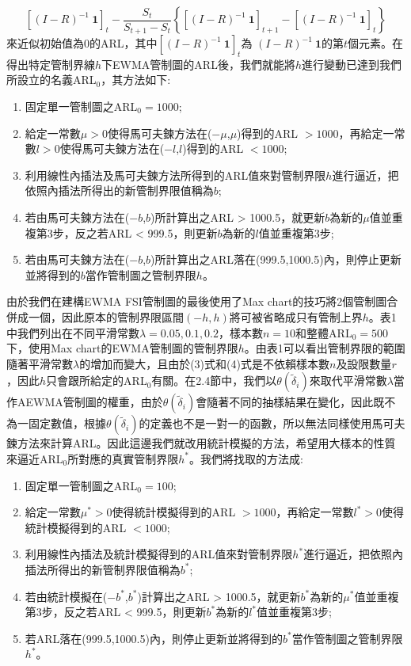 \documentclass[12pt]{article}  %
\theoremstyle{plain}
\begin{document}
\begin{equation}
\left[(I-R)^{-1}~\mathbf{1}\right]_t-\frac{S_t}{S_{t+1}-S_t}\left\{
\left[(I-R)^{-1}~\mathbf{1}\right]_{t+1}-
\left[(I-R)^{-1}~\mathbf{1}\right]_t\right\}
\end{equation}
來近似初始值為0的ARL，其中$\left[(I-R)^{-1}~\mathbf{1}\right]_t$為
$(I-R)^{-1}~\mathbf{1}$的第$t$個元素。在得出特定管制界線$h$下EWMA管制圖的ARL後，我們就能將$h$進行變動已達到我們所設立的名義ARL$_0$，其方法如下:
\begin{enumerate}
\item 固定單一管制圖之ARL$_0 = 1000$;
\item 給定一常數$\mu>0$使得馬可夫鍊方法在($-\mu$,$\mu$)得到的ARL $>1000$，再給定一常數$l>0$使得馬可夫鍊方法在($-l$,$l$)得到的ARL $<1000$;
\item 利用線性內插法及馬可夫鍊方法所得到的ARL值來對管制界限$h$進行逼近，把依照內插法所得出的新管制界限值稱為$b$;
\item 若由馬可夫鍊方法在($-b$,$b$)所計算出之ARL > 1000.5，就更新$b$為新的$\mu$值並重複第3步，反之若ARL < 999.5，則更新$b$為新的$l$值並重複第3步;
\item 若由馬可夫鍊方法在($-b$,$b$)所計算出之ARL落在(999.5,1000.5)內，則停止更新並將得到的$b$當作管制圖之管制界限$h$。
\end{enumerate}
由於我們在建構EWMA FSI管制圖的最後使用了Max chart的技巧將2個管制圖合併成一個，因此原本的管制界限區間$(-h,h)$將可被省略成只有管制上界$h$。表1中我們列出在不同平滑常數$\lambda=0.05,0.1,0.2$，樣本數$n=10$和整體ARL$_0=500$下，使用Max chart的EWMA管制圖的管制界限$h$。由表1可以看出管制界限的範圍隨著平滑常數$\lambda$的增加而變大，且由於(3)式和(4)式是不依賴樣本數$n$及設限數量$r$，因此$h$只會跟所給定的ARL$_0$有關。在2.4節中，我們以$\theta(\tilde{\delta}_i)$來取代平滑常數$\lambda$當作AEWMA管制圖的權重，由於$\theta(\tilde{\delta}_i)$會隨著不同的抽樣結果在變化，因此既不為一固定數值，根據$\theta(\tilde{\delta}_i)$的定義也不是一對一的函數，所以無法同樣使用馬可夫鍊方法來計算ARL。因此這邊我們就改用統計模擬的方法，希望用大樣本的性質來逼近ARL$_0$所對應的真實管制界限$h^*$。我們將找取的方法成:
\begin{enumerate}
\item 固定單一管制圖之ARL$_0=100$;
\item 給定一常數$\mu^* > 0$使得統計模擬得到的ARL $>1000$，再給定一常數$l^*>0$使得統計模擬得到的ARL $<1000$;
\item 利用線性內插法及統計模擬得到的ARL值來對管制界限$h^*$進行逼近，把依照內插法所得出的新管制界限值稱為$b^*$;
\item 若由統計模擬在($-b^*$,$b^*$)計算出之ARL > 1000.5，就更新$b^*$為新的$\mu^*$值並重複第3步，反之若ARL < 999.5，則更新$b^*$為新的$l^*$值並重複第3步;
\item 若ARL落在(999.5,1000.5)內，則停止更新並將得到的$b^*$當作管制圖之管制界限$h^*$。
\end{enumerate}
\end{document}
